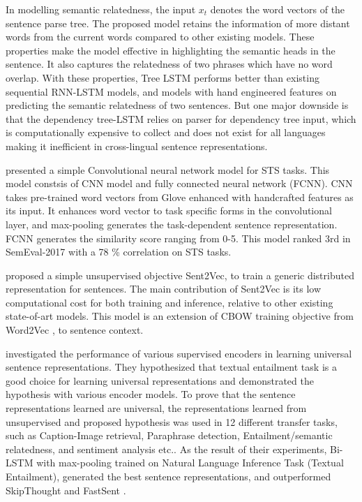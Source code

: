 \documentclass[12pt]{report} %
\begin{document}
In modelling semantic relatedness, the input $x_{t}$ denotes the word vectors of the sentence parse tree. The proposed model retains the information of more distant words from the current words compared to other existing models. These properties make the model effective in highlighting the semantic heads in the sentence. It also captures the relatedness of two phrases which have no word overlap. With these properties, Tree LSTM performs better than existing sequential RNN-LSTM models, and models with hand engineered features on predicting the semantic relatedness of two sentences. But one major downside is that the dependency tree-LSTM relies on parser for dependency tree input, which is computationally expensive to collect and does not exist for all languages making it inefficient in cross-lingual sentence representations.



\cite{shao2017hcti} presented a simple Convolutional neural network model for STS tasks. This model constsis of CNN model and fully connected neural network (FCNN). CNN takes pre-trained word vectors from Glove \cite{pennington2014glove} enhanced with handcrafted features as its input. It enhances word vector to task specific forms in the convolutional layer, and max-pooling generates the task-dependent sentence representation. FCNN generates the similarity score ranging from 0-5. This model ranked 3rd in SemEval-2017 with a 78 \% correlation on STS tasks. 


\cite{pagliardini2017unsupervised} proposed a simple unsupervised objective Sent2Vec, to train a generic distributed representation for sentences. The main contribution of Sent2Vec is its low computational cost for both training and inference, relative to other existing state-of-art models. This model is an extension of CBOW training objective from Word2Vec \citep{mikolov2014word2vec}, to sentence context.


\cite{conneau2017supervised} investigated the performance of various supervised encoders in learning universal sentence representations. They hypothesized that textual entailment task is a good choice for learning universal representations and demonstrated the hypothesis with various encoder models. To prove that the sentence representations learned are universal, the representations learned from unsupervised and proposed hypothesis was used in 12 different transfer tasks, such as Caption-Image retrieval, Paraphrase detection, Entailment/semantic relatedness, and sentiment analysis etc.. As the result of their experiments, Bi-LSTM with max-pooling trained on Natural Language Inference Task (Textual Entailment), generated the best sentence representations, and outperformed SkipThought \cite{kiros2015skip} and FastSent \cite{hill2016learning}.
\end{document}
